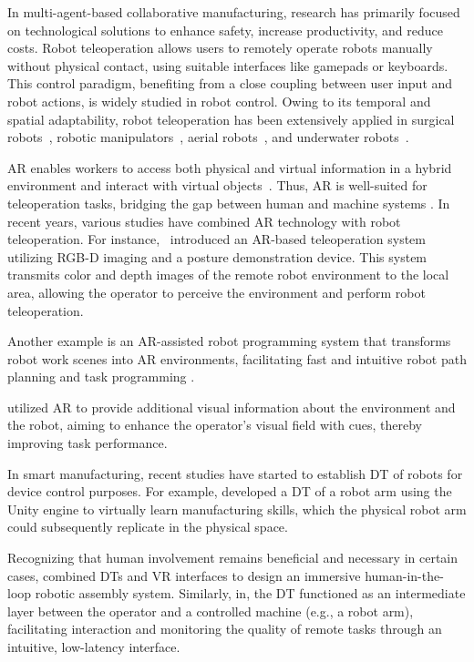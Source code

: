 \begin{enumerate}
    In multi-agent-based collaborative manufacturing, research has primarily focused on technological solutions to enhance safety, increase productivity, and reduce costs. Robot teleoperation allows users to remotely operate robots manually without physical contact, using suitable interfaces like gamepads or keyboards. This control paradigm, benefiting from a close coupling between user input and robot actions, is widely studied in robot control. Owing to its temporal and spatial adaptability, robot teleoperation has been extensively applied in surgical robots~\cite{22}, robotic manipulators~\cite{11}, aerial robots~\cite{23}, and underwater robots~\cite{24}.
    
    \ac{AR} enables workers to access both physical and virtual information in a hybrid environment and interact with virtual objects~\cite{26,27}. Thus, \ac{AR} is well-suited for teleoperation tasks, bridging the gap between human and machine systems \cite{this-article}. In recent years, various studies have combined \ac{AR} technology with robot teleoperation. For instance,~\cite{10} introduced an \ac{AR}-based teleoperation system utilizing RGB-D imaging and a posture demonstration device. This system transmits color and depth images of the remote robot environment to the local area, allowing the operator to perceive the environment and perform robot teleoperation.
    
    Another example is an \ac{AR}-assisted robot programming system that transforms robot work scenes into \ac{AR} environments, facilitating fast and intuitive robot path planning and task programming \cite{30}.

    \cite{32} utilized \ac{AR} to provide additional visual information about the environment and the robot, aiming to enhance the operator's visual field with cues, thereby improving task performance.

    In smart manufacturing, recent studies have started to establish \ac{DT} of robots for device control purposes. For example, \cite{37} developed a \ac{DT} of a robot arm using the Unity engine to virtually learn manufacturing skills, which the physical robot arm could subsequently replicate in the physical space.

    Recognizing that human involvement remains beneficial and necessary in certain cases,\cite{41} combined \acp{DT} and \ac{VR} interfaces to design an immersive human-in-the-loop robotic assembly system. Similarly, in\cite{42}, the \ac{DT} functioned as an intermediate layer between the operator and a controlled machine (e.g., a robot arm), facilitating interaction and monitoring the quality of remote tasks through an intuitive, low-latency interface.


\end{enumerate}
